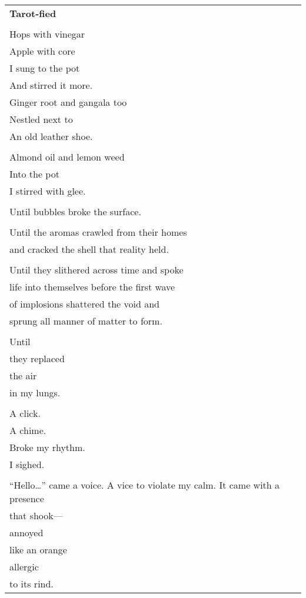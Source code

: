 \documentclass{article}
\begin{document}
\begin{center}
\begin{tabular}{l}
\textbf{Tarot-fied} \\
\\
Hops with vinegar \\
Apple with core \\
I sung to the pot \\
And stirred it more. \\

Ginger root and gangala too \\
Nestled next to \\
An old leather shoe. \\
\\
Almond oil and lemon weed \\
Into the pot \\
I stirred with glee. \\
\\
Until bubbles broke the surface. \\ %
\\
Until the aromas crawled from their homes \\
and cracked the shell that reality held. \\
\\
Until they slithered across time and spoke \\
life into themselves before the first wave \\
of implosions shattered the void and \\
sprung all manner of matter to form. \\
\\
Until \\
they replaced \\
the air \\
in my lungs. \\
\\
A click. \\
A chime. \\
Broke my rhythm. \\
I sighed. \\
\\
``Hello\ldots'' came a voice.
A vice to violate my calm.
It came with a presence \\
that shook--- \\
annoyed \\
like an orange \\
allergic \\
to its rind. \\

\end{tabular}
\end{center}
\end{document}
